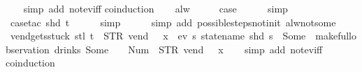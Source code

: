 \begin{isabellebody}
%
\isadelimproof
\ \ %
\endisadelimproof
%
\isatagproof
{}\isamarkupfalse%
\ {\isacharparenleft}simp\ add{\isacharcolon}\ not{\isacharunderscore}ev{\isacharunderscore}iff{\isacharparenright}\isanewline
{}\isamarkupfalse%
{\isacharparenleft}coinduction{\isacharparenright}\isanewline
\ \ \isamarkupfalse%
\ alw\isanewline
\ \ \isamarkupfalse%
\ \isamarkupfalse%
\ {\isacharquery}case\isanewline
\ \ \ \ \isamarkupfalse%
\ simp\isanewline
\ \ \ \ \isamarkupfalse%
\ {\isacharparenleft}case{\isacharunderscore}tac\ {\isachardoublequoteopen}shd\ t{\isachardoublequoteclose}{\isacharparenright}\isanewline
\ \ \ \ \isamarkupfalse%
\ simp\isanewline
\ \ \ \ \isamarkupfalse%
\ {\isacharparenleft}simp\ add{\isacharcolon}\ possible{\isacharunderscore}steps{\isacharunderscore}not{\isacharunderscore}init\ alw{\isacharunderscore}not{\isacharunderscore}some{\isacharparenright}\isanewline
{}\isamarkupfalse%
%
\endisatagproof
{\isafoldproof}%
%
\isadelimproof
\isanewline
%
\endisadelimproof
\isanewline
{}\isamarkupfalse%
\ vend{\isacharunderscore}gets{\isacharunderscore}stuck{\isacharcolon}\ {\isachardoublequoteopen}stl\ t\ {\isacharequal}\ {\isacharparenleft}STR\ {\isacharprime}{\isacharprime}vend{\isacharprime}{\isacharprime}{\isacharcomma}\ {\isacharbrackleft}{\isacharbrackright}{\isacharparenright}\ {\isacharhash}{\isacharhash}\ x{}\ {\isasymLongrightarrow}\ {\isasymnot}ev\ {\isacharparenleft}{\isasymlambda}s{\isachardot}\ statename\ {\isacharparenleft}shd\ s{\isacharparenright}\ {\isacharequal}\ Some\ {}{\isacharparenright}\ {\isacharparenleft}make{\isacharunderscore}full{\isacharunderscore}observation\ drinks\ {\isacharparenleft}Some\ {}{\isacharparenright}\ {\isacharless}{}\ {\isacharcolon}{\isacharequal}\ Num\ {}{\isachargreater}\ {\isacharparenleft}{\isacharparenleft}STR\ {\isacharprime}{\isacharprime}vend{\isacharprime}{\isacharprime}{\isacharcomma}\ {\isacharbrackleft}{\isacharbrackright}{\isacharparenright}\ {\isacharhash}{\isacharhash}\ x{}{\isacharparenright}{\isacharparenright}{\isachardoublequoteclose}\isanewline
%
\isadelimproof
\ \ %
\endisadelimproof
%
\isatagproof
{}\isamarkupfalse%
\ {\isacharparenleft}simp\ add{\isacharcolon}\ not{\isacharunderscore}ev{\isacharunderscore}iff{\isacharparenright}\isanewline
{}\isamarkupfalse%
{\isacharparenleft}coinduction{\isacharparenright}\isanewline

\end{isabellebody}
